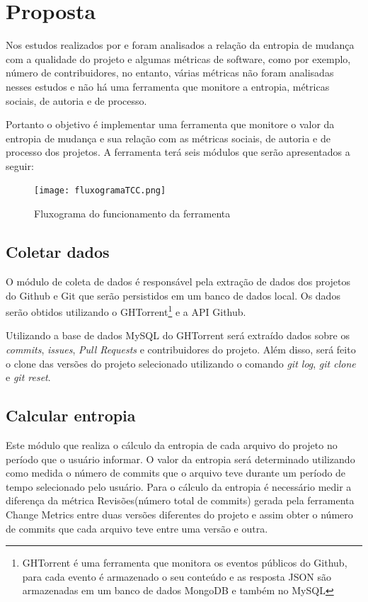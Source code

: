 \chapter{Proposta}
Nos estudos realizados por  e  foram analisados a relação da entropia de mudança com a qualidade do projeto e algumas métricas de software, como por exemplo, número de contribuidores, no entanto, várias métricas não foram analisadas nesses estudos e não há uma ferramenta que monitore a entropia, métricas sociais, de autoria e de processo.

Portanto o objetivo é implementar uma ferramenta que monitore o valor da entropia de mudança e sua relação com as métricas sociais, de autoria e de processo dos projetos. A ferramenta terá seis módulos que serão apresentados a seguir:

\begin{figure}[h]
	\captionsetup{justification=centering}
	\texttt{[image: fluxogramaTCC.png]}
	\caption{Fluxograma do funcionamento da ferramenta}
	\label{figura:fluxogramaimagem}
\end{figure}

\section{Coletar dados}
O módulo de coleta de dados é responsável pela extração de dados dos projetos do Github e Git que serão persistidos em um banco de dados local. Os dados serão obtidos utilizando o GHTorrent\footnote{GHTorrent é uma ferramenta que monitora os eventos públicos do Github, para cada evento é armazenado o seu conteúdo e as resposta JSON são armazenadas em um banco de dados MongoDB e também no MySQL} e a API Github.

Utilizando a base de dados MySQL do GHTorrent será extraído dados sobre os \textit{commits}, \textit{issues}, \textit{Pull Requests} e contribuidores do projeto. Além disso, será feito o clone das versões do projeto selecionado utilizando o comando \textit{git log}, \textit{git clone} e \textit{git reset}. 

\section{Calcular entropia}
Este módulo que realiza o cálculo da entropia de cada arquivo do projeto no período que o usuário informar. O valor da entropia será determinado utilizando como medida o número de commits que o arquivo teve durante um período de tempo selecionado pelo usuário. Para o cálculo da entropia é necessário medir a diferença da métrica Revisões(número total de commits) gerada pela ferramenta Change Metrics entre duas versões diferentes do projeto e assim obter o número de commits que cada arquivo teve entre uma versão e outra.

